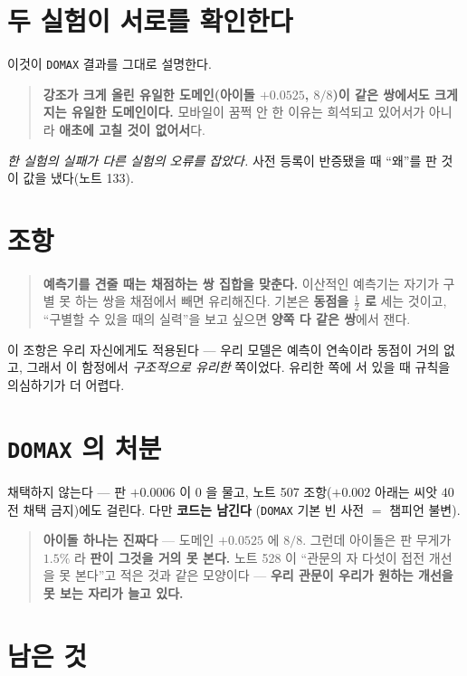 \documentclass[11pt]{article}
\begin{document}
\section{두 실험이 서로를 확인한다}

이것이 \texttt{DOMAX} 결과를 그대로 설명한다.

\begin{quote}
\textbf{강조가 크게 올린 유일한 도메인(아이돌 $+0.0525$, $8/8$)이 같은 쌍에서도
크게 지는 유일한 도메인이다.} 모바일이 꿈쩍 안 한 이유는 희석되고 있어서가
아니라 \textbf{애초에 고칠 것이 없어서}다.
\end{quote}

\emph{한 실험의 실패가 다른 실험의 오류를 잡았다.} 사전 등록이 반증됐을 때
``왜''를 판 것이 값을 냈다(노트 133).

\section*{조항}

\begin{quote}
\textbf{예측기를 견줄 때는 채점하는 쌍 집합을 맞춘다.} 이산적인 예측기는
자기가 구별 못 하는 쌍을 채점에서 빼면 유리해진다. 기본은 \textbf{동점을
$\frac{1}{2}$ 로} 세는 것이고, ``구별할 수 있을 때의 실력''을 보고 싶으면
\textbf{양쪽 다 같은 쌍}에서 잰다.
\end{quote}

이 조항은 우리 자신에게도 적용된다 --- 우리 모델은 예측이 연속이라 동점이
거의 없고, 그래서 이 함정에서 \emph{구조적으로 유리한} 쪽이었다. 유리한
쪽에 서 있을 때 규칙을 의심하기가 더 어렵다.

\section*{\texttt{DOMAX} 의 처분}

채택하지 않는다 --- 판 $+0.0006$ 이 $0$ 을 물고, 노트 507 조항($+0.002$ 아래는
씨앗 $40$ 전 채택 금지)에도 걸린다. 다만 \textbf{코드는 남긴다}
(\texttt{DOMAX} 기본 빈 사전 $=$ 챔피언 불변).

\begin{quote}
\textbf{아이돌 하나는 진짜다} --- 도메인 $+0.0525$ 에 $8/8$. 그런데 아이돌은
판 무게가 $1.5\%$ 라 \textbf{판이 그것을 거의 못 본다.} 노트 528 이
``관문의 자 다섯이 접전 개선을 못 본다''고 적은 것과 같은 모양이다 ---
\textbf{우리 관문이 우리가 원하는 개선을 못 보는 자리가 늘고 있다.}
\end{quote}

\section*{남은 것}
\end{document}
